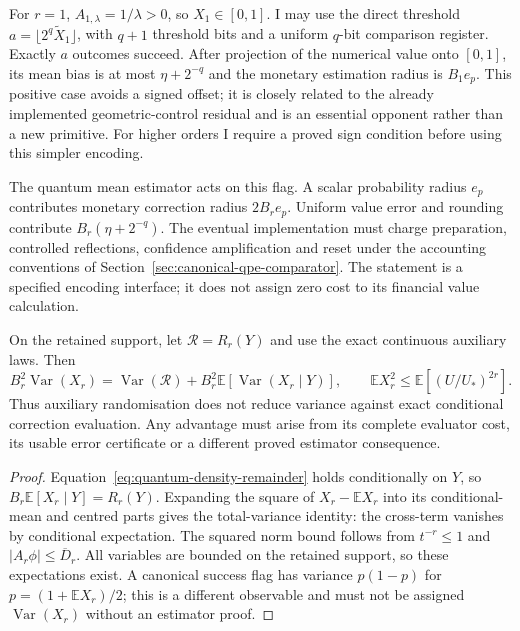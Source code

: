 For $r=1$, $A_{1,\lambda}=1/\lambda>0$, so $X_1\in[0,1]$.
I may use the direct threshold $a=\lfloor2^q\widetilde X_1\rfloor$,
with $q+1$ threshold bits and a uniform $q$-bit comparison register.
Exactly $a$ outcomes succeed. After projection of the numerical value
onto $[0,1]$, its mean bias is at most $\eta+2^{-q}$ and the monetary
estimation radius is $B_1e_p$. This positive case avoids a signed offset;
it is closely related to the already implemented geometric-control
residual and is an essential opponent rather than a new primitive.
For higher orders I require a proved sign condition before using this
simpler encoding.

The quantum mean estimator acts on this flag. A scalar probability radius
$e_p$ contributes monetary correction radius $2B_r e_p$. Uniform value
error and rounding contribute $B_r(\eta+2^{-q})$. The eventual implementation must charge preparation, controlled
reflections, confidence amplification and reset under the accounting
conventions of Section~\ref{sec:canonical-qpe-comparator}. The statement is
a specified encoding interface; it does not assign zero cost to its
financial value calculation.

\begin{proposition}
\label{prop:integral-randomisation-variance}
On the retained support, let $\mathcal R=R_r(Y)$ and use the exact
continuous auxiliary laws. Then
\[
 B_r^2\operatorname{Var}(X_r)
 =\operatorname{Var}(\mathcal R)
   +B_r^2\mathbb E[\operatorname{Var}(X_r\mid Y)],\qquad
 \mathbb E X_r^2\leq\mathbb E[(U/U_*)^{2r}].
\]
Thus auxiliary randomisation does not reduce variance against exact
conditional correction evaluation. Any advantage must arise from its
complete evaluator cost, its usable error certificate or a different
proved estimator consequence.
\end{proposition}
\begin{proof}
Equation~\eqref{eq:quantum-density-remainder} holds conditionally on $Y$,
so $B_r\mathbb E[X_r\mid Y]=R_r(Y)$. Expanding the square of
$X_r-\mathbb E X_r$ into its conditional-mean and centred parts gives
the total-variance identity: the cross-term vanishes by conditional
expectation. The squared norm bound follows from $t^{-r}\leq1$ and
$|A_r\phi|\leq\overline D_r$. All variables are bounded on the retained
support, so these expectations exist. A canonical success flag has variance
$p(1-p)$ for $p=(1+\mathbb E X_r)/2$; this is a different observable and
must not be assigned $\operatorname{Var}(X_r)$ without an estimator proof.
\end{proof}

